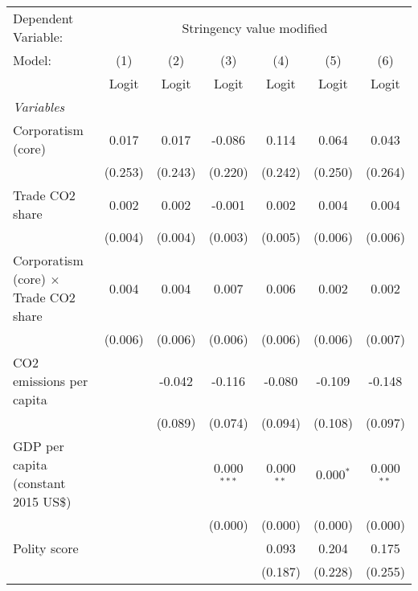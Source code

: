 
\begingroup
\centering
\begin{tabular}{lcccccc}
   \toprule
   Dependent Variable: & \multicolumn{6}{c}{Stringency value modified}\\
   Model:                                       & (1)     & (2)     & (3)           & (4)          & (5)         & (6)\\  
                                                &  Logit  & Logit   & Logit         & Logit        & Logit       & Logit\\  
   \midrule
   \emph{Variables}\\
   Corporatism (core)                           & 0.017   & 0.017   & -0.086        & 0.114        & 0.064       & 0.043\\   
                                                & (0.253) & (0.243) & (0.220)       & (0.242)      & (0.250)     & (0.264)\\   
   Trade CO2 share                              & 0.002   & 0.002   & -0.001        & 0.002        & 0.004       & 0.004\\   
                                                & (0.004) & (0.004) & (0.003)       & (0.005)      & (0.006)     & (0.006)\\   
   Corporatism (core) $\times$ Trade CO2 share  & 0.004   & 0.004   & 0.007         & 0.006        & 0.002       & 0.002\\   
                                                & (0.006) & (0.006) & (0.006)       & (0.006)      & (0.006)     & (0.007)\\   
   CO2 emissions per capita                     &         & -0.042  & -0.116        & -0.080       & -0.109      & -0.148\\   
                                                &         & (0.089) & (0.074)       & (0.094)      & (0.108)     & (0.097)\\   
   GDP per capita (constant 2015 US\$)          &         &         & 0.000$^{***}$ & 0.000$^{**}$ & 0.000$^{*}$ & 0.000$^{**}$\\   
                                                &         &         & (0.000)       & (0.000)      & (0.000)     & (0.000)\\   
   Polity score                                 &         &         &               & 0.093        & 0.204       & 0.175\\   
                                                &         &         &               & (0.187)      & (0.228)     & (0.255)\\   

\end{tabular}
